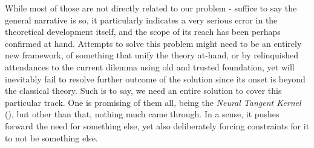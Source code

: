 While most of those are not directly related to our problem - suffice to say the general narrative is so, it particularly indicates a very serious error in the theoretical development itself, and the scope of its reach has been perhaps confirmed at hand. Attempts to solve this problem might need to be an entirely new framework, of something that unify the theory at-hand, or by relinquished attendances to the current dilemma using old and trusted foundation, yet will inevitably fail to resolve further outcome of the solution since its onset is beyond the classical theory. Such is to say, we need an entire solution to cover this particular track. One is promising of them all, being the \textit{Neural Tangent Kernel} (\cite{Jacot:2018:NTK}), but other than that, nothing much came through. In a sense, it pushes forward the need for something else, yet also deliberately forcing constraints for it to not be something else. 
